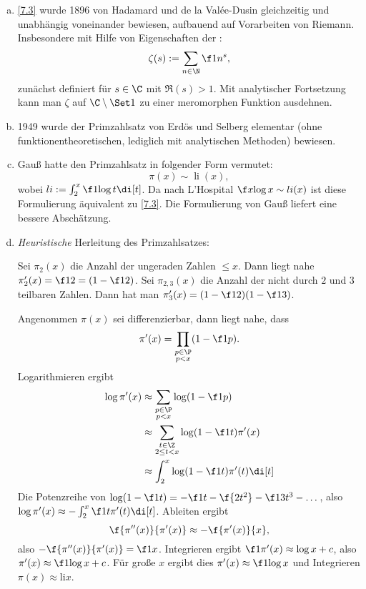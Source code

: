\begin{nt} \label{7.4}
	\begin{enumerate}[a)]
		\item
			\ref{7.3} wurde 1896 von Hadamard und de la Valée-Dusin gleichzeitig und unabhängig voneinander bewiesen, aufbauend auf Vorarbeiten von Riemann.
			Insbesondere mit Hilfe von Eigenschaften der :
			\[
				\zeta(s) := \sum_{n\in \N} \f 1{n^s},
			\]
			zunächst definiert für $s \in \C$ mit $\Re(s) > 1$.
			Mit analytischer Fortsetzung kann man $\zeta$ auf $\C \setminus \Set 1$ zu einer meromorphen Funktion ausdehnen.
		\item
			1949 wurde der Primzahlsatz von Erdös und Selberg elementar (ohne funktionentheoretischen, lediglich mit analytischen Methoden) bewiesen.
		\item
			Gauß hatte den Primzahlsatz in folgender Form vermutet:
			\[
				\pi(x) \sim \mathop{li}(x),
			\]
			wobei $\mathop{li} := \int_{2}^x \f 1{\log t} \di[t]$.
			Da nach L'Hospital $\f x{\log x} \sim \mathop{li}(x)$ ist diese Formulierung äquivalent zu \ref{7.3}.
			Die Formulierung von Gauß liefert eine bessere Abschätzung.
		\item
			\emph{Heuristische} Herleitung des Primzahlsatzes:
			
			Sei $\pi_2(x)$ die Anzahl der ungeraden Zahlen $\le x$.
			Dann liegt nahe $\pi_2'(x) = \f 12 = (1 - \f 12)$.
			Sei $\pi_{2,3}(x)$ die Anzahl der nicht durch $2$ und $3$ teilbaren Zahlen.
			Dann hat man $\pi_3'(x) = (1 - \f 12)(1 - \f 13)$.

			Angenommen $\pi(x)$ sei differenzierbar, dann liegt nahe, dass
			\[
				\pi'(x) = \prod_{\substack{p\in \P \\ p < x}} (1 - \f 1p).
			\]
			Logarithmieren ergibt
			\begin{align*}
				\log \pi'(x) &\approx \sum_{\substack{p \in \P \\ p < x}} \log(1 - \f 1p) \\
				&\approx \sum_{\substack{t \in \Z \\ 2 \le t < x}} \log(1 - \f 1t) \pi'(x) \\
				&\approx \int_2^x \log(1 - \f 1t) \pi'(t) \di[t] 
			\end{align*}
			Die Potenzreihe von $\log(1 - \f 1t) = - \f 1t - \f {2t^2} - \f 1{3t^3} - \dotsc$, also $\log \pi'(x) \approx -\int_2^x \f 1t \pi'(t) \di[t]$.
			Ableiten ergibt
			\[
				\f{\pi''(x)}{\pi'(x)} \approx - \f{\pi'(x)}{x},
			\]
			also $- \f{\pi''(x)}{\pi'(x)} = \f 1{x}$.
			Integrieren ergibt $\f 1{\pi'(x)} \approx \log x + c$, also $\pi'(x) \approx \f 1{\log x + c}$.
			Für große $x$ ergibt dies $\pi'(x) \approx \f 1{\log x}$ und Integrieren $\pi(x) \approx \mathrm{li} x$.
	\end{enumerate}
\end{nt}

